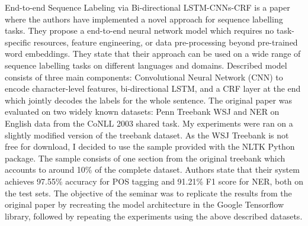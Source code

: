 End-to-end Sequence Labeling via Bi-directional LSTM-CNNs-CRF\cite{ma2016end} is a
paper where the authors have implemented a novel approach for sequence labelling tasks.
They propose a end-to-end neural network model which requires no task-specific
resources, feature engineering, or data pre-processing beyond pre-trained word
embeddings. They state that their approach can be used on a wide range of
sequence labelling tasks on different languages and domains. Described model
consists of three main components: Convolutional Neural Network
(CNN)\cite{lecun1989backpropagation} to encode character-level features, bi-directional
LSTM, and a CRF layer at the end which jointly decodes the labels
for the whole sentence. The original paper was evaluated on two widely known
datasets: Penn Treebank WSJ\cite{marcus1993building} and NER on English data
from the CoNLL 2003 shared task\cite{tjong2003introduction}. My experiments
were ran on a slightly
modified version of the treebank dataset. As the WSJ Treebank is not free for
download, I decided to use the sample provided with the NLTK Python
package\cite{bird2006nltk}. The sample consists of one section from the original
treebank which accounts to around 10\% of the complete dataset.
Authors state that their system achieves 97.55\% accuracy for POS tagging
and 91.21\% F1 score for NER, both on the test sets. The objective of the seminar
was to replicate the results from the original paper by recreating the
model architecture in the Google Tensorflow library\cite{abadi2016tensorflow},
followed by repeating the experiments using the above described datasets.



